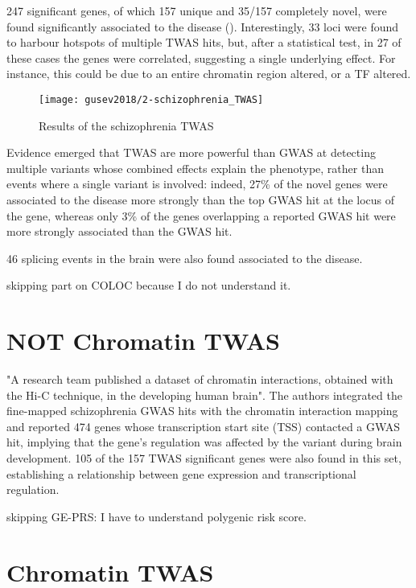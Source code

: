 \documentclass[../main.tex]{subfiles}
\begin{document}
247 significant genes, of which 157 unique and 35/157 completely novel, 
	were found significantly associated to the disease 
(). Interestingly, 33 loci were found to harbour 
hotspots of multiple TWAS hits, but, after a statistical test, in 27 of 
these cases the genes were correlated, suggesting a single underlying 
effect. For instance, this could be due to an entire chromatin region 
altered, or a TF altered.

\begin{figure}
	\texttt{[image: gusev2018/2-schizophrenia\_TWAS]}
	\caption{Results of the schizophrenia TWAS}
\end{figure}

Evidence emerged that TWAS are more powerful than GWAS at detecting 
multiple variants whose combined effects explain the phenotype, rather 
than events where a single variant is involved: indeed, 27\% of the 
novel genes were associated to the disease more strongly than the top 
GWAS hit at the locus of the gene, whereas only 3\% of the genes 
overlapping a reported GWAS hit were more strongly associated than the 
GWAS hit.

46 splicing events in the brain were also found associated to the 
   disease.

skipping part on COLOC because I do not understand it.

\section{NOT Chromatin TWAS}

"A research team published a dataset of chromatin interactions, obtained 
with the Hi-C technique, in the developing human brain". The authors 
integrated the fine-mapped schizophrenia GWAS hits with the chromatin 
interaction mapping and reported 474 genes whose transcription start 
site (TSS) contacted a GWAS hit, implying that the gene's regulation was 
affected by the variant during brain development. 105 of the 157 TWAS 
significant genes were also found in this set, establishing a 
relationship between gene expression and transcriptional regulation.

skipping GE-PRS: I have to understand polygenic risk score.

\section{Chromatin TWAS}
\end{document}
